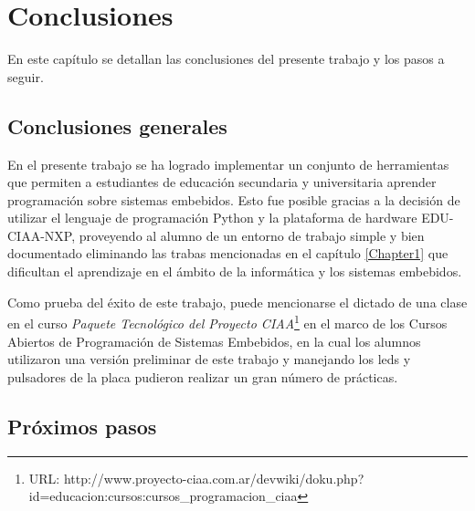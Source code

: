 
\chapter{Conclusiones} %

\label{Chapter5} %

En este capítulo se detallan las conclusiones del presente trabajo y los pasos a seguir.



\section{Conclusiones generales }

En el presente trabajo se ha logrado implementar un conjunto de herramientas que permiten a estudiantes  de educación secundaria y universitaria aprender programación sobre sistemas embebidos. Esto fue posible gracias a la decisión de utilizar el lenguaje de programación Python y la plataforma de hardware EDU-CIAA-NXP, proveyendo al alumno de un entorno de trabajo simple y bien documentado eliminando las trabas mencionadas en el capítulo \ref{Chapter1} que dificultan el aprendizaje en el ámbito de la informática y los sistemas embebidos.

Como prueba del éxito de este trabajo, puede mencionarse el dictado de una clase en el curso \textit{Paquete Tecnológico del Proyecto CIAA}\footnote{URL: http://www.proyecto-ciaa.com.ar/devwiki/doku.php?id=educacion:cursos:cursos\_programacion\_ciaa} en el marco de los Cursos Abiertos de Programación de Sistemas Embebidos, en la cual los alumnos utilizaron una versión preliminar de este trabajo y manejando los leds y pulsadores de la placa pudieron realizar un gran número de prácticas.


\section{Próximos pasos}


